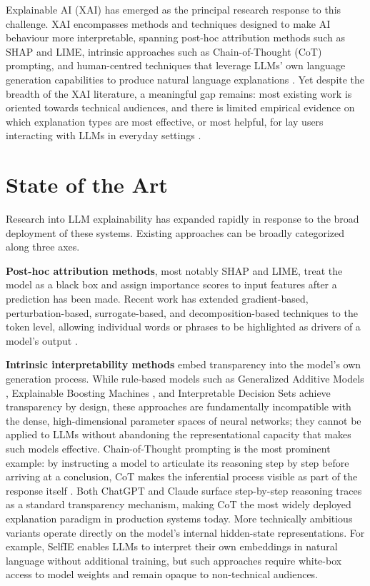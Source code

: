 Explainable AI (XAI) has emerged as the principal research response to this challenge.
XAI encompasses methods and techniques designed to make AI behaviour more
interpretable, spanning post-hoc attribution methods such as SHAP and LIME,
intrinsic approaches such as Chain-of-Thought (CoT) prompting, and
human-centred techniques that leverage LLMs' own language generation capabilities
to produce natural language explanations \cite{wu_usable_2025}.
Yet despite the breadth of the XAI literature, a meaningful gap remains:
most existing work is oriented towards technical audiences, and there is limited
empirical evidence on which explanation types are most effective, or most helpful, for
lay users interacting with LLMs in everyday settings \cite{wu_usable_2025}.
 
\section{State of the Art}
 
Research into LLM explainability has expanded rapidly in response to the broad
deployment of these systems.
Existing approaches can be broadly categorized along three axes.
 
\textbf{Post-hoc attribution methods}, most notably SHAP \cite{lundberg_unified_2017} and LIME\cite{ribeiro_why_2016},
treat the model as a black box and assign importance scores to input features after
a prediction has been made.
Recent work has extended gradient-based, perturbation-based, surrogate-based, and
decomposition-based techniques to the token level, allowing individual words or phrases
to be highlighted as drivers of a model's output \cite{wu_usable_2025, smilkov_smoothgrad_2017, ancona_towards_2018, zhou_learning_2015, selvaraju_grad-cam_2020, binder_layer-wise_2016, grosse_studying_2023}.
 
\textbf{Intrinsic interpretability methods} embed transparency into the model's own generation process.
While rule-based models such as Generalized Additive Models \cite{caruana_intelligible_2015},
Explainable Boosting Machines \cite{lou_accurate_2013}, and Interpretable Decision Sets
\cite{lakkaraju_interpretable_2016} achieve transparency by design, these approaches are
fundamentally incompatible with the dense, high-dimensional parameter spaces of neural
networks; they cannot be applied to LLMs without abandoning the representational capacity
that makes such models effective.
Chain-of-Thought prompting is the most prominent example: by instructing a model
to articulate its reasoning step by step before arriving at a conclusion, CoT makes
the inferential process visible as part of the response itself \cite{wu_usable_2025}. 
Both ChatGPT \cite{guan_monitoring_2025} and Claude \cite{lindsey_biology_nodate} surface step-by-step reasoning traces as a standard transparency mechanism, making CoT the most widely deployed explanation paradigm
in production systems today.
More technically ambitious variants operate directly on the model's internal hidden-state
representations. For example, SelfIE \cite{chen_selfie_2024} enables LLMs to
interpret their own embeddings in natural language without additional training, but
such approaches require white-box access to model weights and remain opaque to
non-technical audiences.
 
